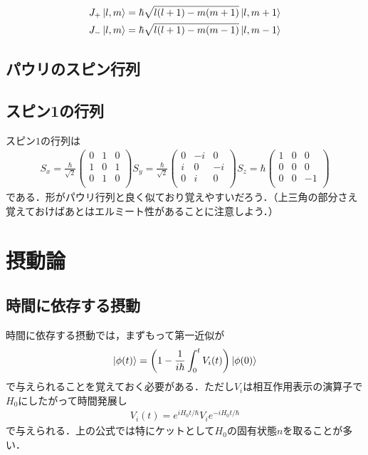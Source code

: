 \documentclass[a4j]{jarticle}
\begin{document}
\begin{align*}
 J_+\ket{l,m}=\hbar\sqrt{l(l+1)-m(m+1)}\ket{l,m+1} \\
 J_-\ket{l,m}=\hbar\sqrt{l(l+1)-m(m-1)}\ket{l,m-1} \\
\end{align*}


\subsection{パウリのスピン行列}

\subsection{スピン1の行列}
スピン$1$の行列は
\begin{align*}
 S_x=\frac{\hbar}{\sqrt{2}}\left(
  \begin{array}{ccc}
   0&1 &0 \\
   1&0 &1 \\
   0&1 &0 \\
 \end{array}\right)
 S_y=\frac{\hbar}{\sqrt{2}}\left(
 \begin{array}{ccc}
  0&-i &0 \\
  i&0 &-i \\
  0&i &0 \\
 \end{array}\right)
 S_z=\hbar\left(
 \begin{array}{ccc}
  1&0 &0 \\
  0&0 &0 \\
  0&0 &-1 \\
 \end{array}\right)
\end{align*}
である．形がパウリ行列と良く似ており覚えやすいだろう．（上三角の部分さえ覚えておけばあとはエルミート性があることに注意しよう．）


\section{摂動論}
\subsection{時間に依存する摂動}
時間に依存する摂動では，まずもって第一近似が
\begin{align*}
 \ket{\phi(t)}=\left(1-\frac{1}{i\hbar}\int_{0}^{t}V_i(t)\right) \ket{\phi(0)}
\end{align*}
で与えられることを覚えておく必要がある．ただし$V_i$は相互作用表示の演算子で$H_0$にしたがって時間発展し
\begin{align*}
 V_i(t)=e^{iH_0t/\hbar}V_ie^{-iH_0t/\hbar}
\end{align*}
で与えられる．上の公式では特にケットとして$H_0$の固有状態$n$を取ることが多い．
\end{document}
